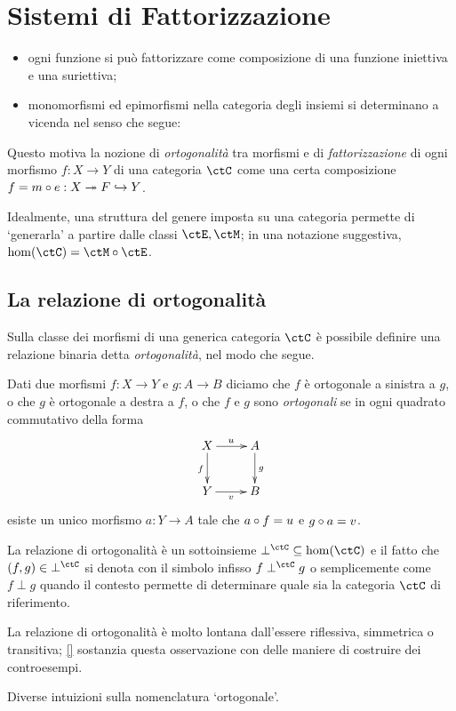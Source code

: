 \chapter{Sistemi di Fattorizzazione}
\begin{itemize}
	\item ogni funzione si può fattorizzare come composizione di una funzione iniettiva e una suriettiva;
	\item monomorfismi ed epimorfismi nella categoria degli insiemi si determinano a vicenda nel senso che segue:
\end{itemize}
Questo motiva la nozione di \emph{ortogonalità} tra morfismi e di \emph{fattorizzazione} di ogni morfismo \(f : X\to Y\) di una categoria \(\ctC\) come una certa composizione \(f = m\circ e : X \twoheadrightarrow F \hookrightarrow Y\).

Idealmente, una struttura del genere imposta su una categoria permette di `generarla' a partire dalle classi \(\ctE,\ctM\); in una notazione suggestiva, \(\hom(\ctC)=\ctM\circ \ctE\).
\section[Ortogonalità]{La relazione di ortogonalità}
Sulla classe dei morfismi di una generica categoria \(\ctC\) è possibile definire una relazione binaria detta \emph{ortogonalità}, nel modo che segue.
\begin{definition}
	Dati due morfismi \(f : X\to Y\) e \(g : A\to B\) diciamo che \(f\) è ortogonale a sinistra a \(g\), o che \(g\) è ortogonale a destra a \(f\), o che \(f\) e \(g\) sono \emph{ortogonali} se in ogni quadrato commutativo della forma
	\[
		\vcenter{\xymatrix{%
				X \ar[r]^u\ar[d]_f & A\ar[d]^g\\
				Y \ar[r]_v & B
			}}\]
	esiste un unico morfismo \(a : Y\to A\) tale che \(a\circ f=u\) e \(g\circ a=v\).
\end{definition}
La relazione di ortogonalità è un sottoinsieme \(\mathbin{\perp^\ctC} \subseteq \hom(\ctC)\) e il fatto che \((f,g)\in \mathbin{\perp^\ctC}\) si denota con il simbolo infisso \(f\perp^\ctC g\) o semplicemente come \(f\perp g\) quando il contesto permette di determinare quale sia la categoria \(\ctC\) di riferimento.

La relazione di ortogonalità è molto lontana dall'essere riflessiva, simmetrica o transitiva; \autoref{} sostanzia questa osservazione con delle maniere di costruire dei controesempi.
\begin{remark}\label{perche_ortogonale}
	Diverse intuizioni sulla nomenclatura `ortogonale'.
\end{remark}

